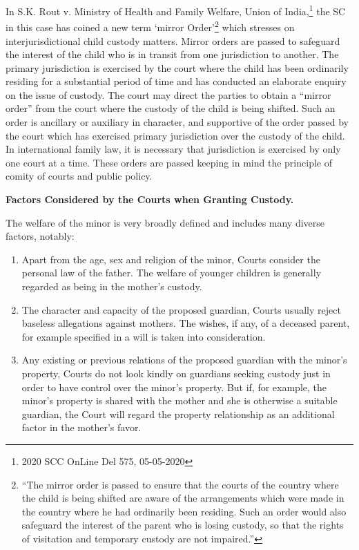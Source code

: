\begin{multicols}{2}
\noi
In S.K. Rout v. Ministry of Health and Family Welfare, Union of India,\footnote{2020 SCC OnLine Del 575, 05-05-2020} the SC in this case has coined a new term ‘mirror Order’\footnote{“The mirror order is passed to ensure that the courts of the country where the child is being shifted are aware of the arrangements which were made in the country where he had ordinarily been residing. Such an order would also safeguard the interest of the parent who is losing custody, so that the rights of visitation and temporary custody are not impaired.”} which stresses on interjurisdictional child custody matters.
\noi
Mirror orders are passed to safeguard the interest of the child who is in transit from one
jurisdiction to another. The primary jurisdiction is exercised by the court where the child has been
ordinarily residing for a substantial period of time and has conducted an elaborate enquiry on the
issue of custody. The court may direct the parties to obtain a “mirror order” from the court where
the custody of the child is being shifted. Such an order is ancillary or auxiliary in character, and
supportive of the order passed by the court which has exercised primary jurisdiction over the
custody of the child. In international family law, it is necessary that jurisdiction is exercised by
only one court at a time. These orders are passed keeping in mind the principle of comity of courts
and public policy.

{\normalsize\bfseries {Factors Considered by the Courts when Granting Custody.}}

\noi
The welfare of the minor is very broadly defined and includes many diverse factors, notably:

\vspace{-.3cm}

\begin{enumerate}
\itemsep=0pt
\item Apart from the age, sex and religion of the minor, Courts consider the personal law of the father. The welfare of younger children is generally regarded as being in the mother's custody.

\item The character and capacity of the proposed guardian, Courts usually reject baseless
allegations against mothers. The wishes, if any, of a deceased parent, for example
specified in a will is taken into consideration.


\item Any existing or previous relations of the proposed guardian with the minor's property,
Courts do not look kindly on guardians seeking custody just in order to have control over
the minor's property. But if, for example, the minor's property is shared with the mother
and she is otherwise a suitable guardian, the Court will regard the property relationship as
an additional factor in the mother's favor.


\end{enumerate}
\end{multicols}
